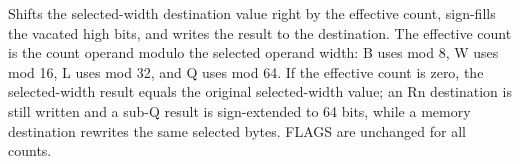 Shifts the selected-width destination value right by the effective count, sign-fills the vacated high bits, and writes the result to the destination. The effective count is the count operand modulo the selected operand width: B uses mod 8, W uses mod 16, L uses mod 32, and Q uses mod 64. If the effective count is zero, the selected-width result equals the original selected-width value; an Rn destination is still written and a sub-Q result is sign-extended to 64 bits, while a memory destination rewrites the same selected bytes. FLAGS are unchanged for all counts.
